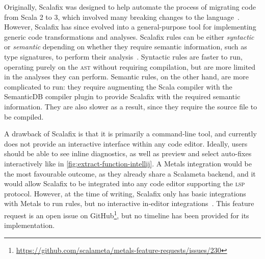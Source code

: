 \documentclass[../../main.tex]{subfiles}
\begin{document}
Originally, Scalafix was designed to help automate the process of migrating code from Scala 2 to 3, which involved many breaking changes to the language~\cite{geirsson_scalafix_2016}.
However, Scalafix has since evolved into a general-purpose tool for implementing generic code transformations and analyses.
Scalafix rules can be either \emph{syntactic} or \emph{semantic} depending on whether they require semantic information, such as type signatures, to perform their analysis~\cite{scalacenter_scalafix_2024}.
Syntactic rules are faster to run, operating purely on the \textsc{ast} without requiring compilation, but are more limited in the analyses they can perform.
Semantic rules, on the other hand, are more complicated to run: they require augmenting the Scala compiler with the SemanticDB compiler plugin to provide Scalafix with the required semantic information.
They are also slower as a result, since they require the source file to be compiled.


A drawback of Scalafix is that it is primarily a command-line tool, and currently does not provide an interactive interface within any code editor.
Ideally, users should be able to see inline diagnostics, as well as preview and select auto-fixes interactively like in \cref{fig:extract-function-intellij}.
A Metals integration would be the most favourable outcome, as they already share a Scalameta backend, and it would allow Scalafix to be integrated into any code editor supporting the \textsc{lsp} protocol.
However, at the time of writing, Scalafix only has basic integrations with Metals to run rules, but no interactive in-editor integrations~\cite{jaglin_scalafix_2024}.
This feature request is an open issue on GitHub\footnote{\url{https://github.com/scalameta/metals-feature-requests/issues/230}}, but no timeline has been provided for its implementation.
\end{document}
